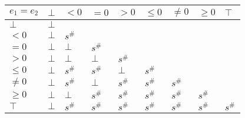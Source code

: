 \documentclass{article}
\begin{document}
\begin{table}
    \begin{tabular}{|l|l|l|l|l|l|l|l|l|}
    \hline
    $e_1 = e_2$ & $\bot$ & $<0$   & $=0$   & $>0$   & $\le 0$ & $\ne 0$ & $\ge 0$ & $\top$ \\ \hline
    $\bot$      & $\bot$ &        &        &        &         &         &         &        \\ \hline
    $<0$        & $\bot$ & $s^\#$ &        &        &         &         &         &        \\ \hline
    $=0$        & $\bot$ & $\bot$ & $s^\#$ &        &         &         &         &        \\ \hline
    $>0$        & $\bot$ & $\bot$ & $\bot$ & $s^\#$ &         &         &         &        \\ \hline
    $\le 0$     & $\bot$ & $s^\#$ & $s^\#$ & $\bot$ & $s^\#$  &         &         &        \\ \hline
    $\ne 0$     & $\bot$ & $s^\#$ & $\bot$ & $s^\#$ & $s^\#$  & $s^\#$  &         &        \\ \hline
    $\ge 0$     & $\bot$ & $\bot$ & $s^\#$ & $s^\#$ & $s^\#$  & $s^\#$  & $s^\#$  &        \\ \hline
    $\top$      & $\bot$ & $s^\#$ & $s^\#$ & $s^\#$ & $s^\#$  & $s^\#$  & $s^\#$  & $s^\#$ \\ \hline
    \end{tabular}
    \end{table}
\end{document}

